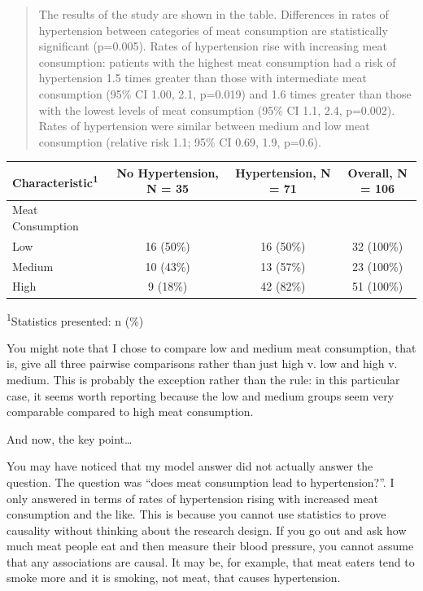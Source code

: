 \documentclass[]{book}
\begin{document}
\begin{quote}
The results of the study are shown in the table. Differences in rates of
hypertension between categories of meat consumption are statistically
significant (p=0.005). Rates of hypertension rise with increasing meat
consumption: patients with the highest meat consumption had a risk of
hypertension 1.5 times greater than those with intermediate meat
consumption (95\% CI 1.00, 2.1, p=0.019) and 1.6 times greater than
those with the lowest levels of meat consumption (95\% CI 1.1, 2.4,
p=0.002). Rates of hypertension were similar between medium and low meat
consumption (relative risk 1.1; 95\% CI 0.69, 1.9, p=0.6).
\end{quote}

\captionsetup[table]{labelformat=empty,skip=1pt}
\begin{longtable}{lccc}
\toprule
\textbf{Characteristic}\textsuperscript{1} & \textbf{No Hypertension}, N = 35 & \textbf{Hypertension}, N = 71 & \textbf{Overall}, N = 106 \\ 
\midrule
Meat Consumption &  &  &  \\ 
Low & 16 (50\%) & 16 (50\%) & 32 (100\%) \\ 
Medium & 10 (43\%) & 13 (57\%) & 23 (100\%) \\ 
High & 9 (18\%) & 42 (82\%) & 51 (100\%) \\ 
\bottomrule
\end{longtable}
\vspace{-5mm}
\begin{minipage}{\linewidth}
\textsuperscript{1}Statistics presented: n (\%) \\ 
\end{minipage}

You might note that I chose to compare low and medium meat consumption,
that is, give all three pairwise comparisons rather than just high v.
low and high v. medium. This is probably the exception rather than the
rule: in this particular case, it seems worth reporting because the low
and medium groups seem very comparable compared to high meat
consumption.

And now, the key point\ldots{}

You may have noticed that my model answer did not actually answer the
question. The question was ``does meat consumption lead to
hypertension?''. I only answered in terms of rates of hypertension
rising with increased meat consumption and the like. This is because you
cannot use statistics to prove causality without thinking about the
research design. If you go out and ask how much meat people eat and then
measure their blood pressure, you cannot assume that any associations
are causal. It may be, for example, that meat eaters tend to smoke more
and it is smoking, not meat, that causes hypertension.
\end{document}
